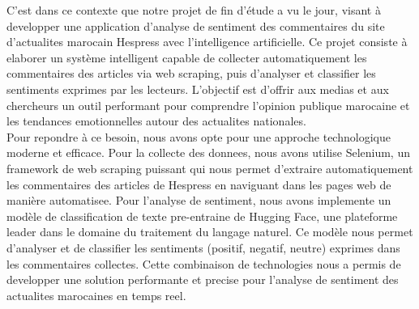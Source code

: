 C'est dans ce contexte que notre projet de fin d'étude a vu le jour, visant à developper une application d'analyse de sentiment des commentaires du site d'actualites marocain Hespress avec l'intelligence artificielle. Ce projet consiste à elaborer un système intelligent capable de collecter automatiquement les commentaires des articles via web scraping, puis d'analyser et classifier les sentiments exprimes par les lecteurs. L'objectif est d'offrir aux medias et aux chercheurs un outil performant pour comprendre l'opinion publique marocaine et les tendances emotionnelles autour des actualites nationales.
\\

Pour repondre à ce besoin, nous avons opte pour une approche technologique moderne et efficace. Pour la collecte des donnees, nous avons utilise Selenium, un framework de web scraping puissant qui nous permet d'extraire automatiquement les commentaires des articles de Hespress en naviguant dans les pages web de manière automatisee. Pour l'analyse de sentiment, nous avons implemente un modèle de classification de texte pre-entraine de Hugging Face, une plateforme leader dans le domaine du traitement du langage naturel. Ce modèle nous permet d'analyser et de classifier les sentiments (positif, negatif, neutre) exprimes dans les commentaires collectes. Cette combinaison de technologies nous a permis de developper une solution performante et precise pour l'analyse de sentiment des actualites marocaines en temps reel.
